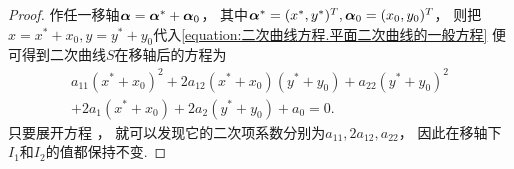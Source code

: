 \begin{theorem}
\begin{proof}
作任一移轴\(\boldsymbol\alpha = \boldsymbol\alpha^* + \boldsymbol\alpha_0\)，
其中\(
	\boldsymbol\alpha^* = (x^*,y^*)^T,
	\boldsymbol\alpha_0 = (x_0,y_0)^T
\)，
则把\(x = x^* + x_0, y = y^* + y_0\)代入\cref{equation:二次曲线方程.平面二次曲线的一般方程}
便可得到二次曲线\(S\)在移轴后的方程为\begin{equation}\label{equation:二次曲线方程的不变量.移轴后的方程}
	\begin{array}{r}
		a_{11} (x^* + x_0)^2
		+ 2 a_{12} (x^* + x_0) (y^* + y_0)
		+ a_{22} (y^* + y_0)^2 \\
		+ 2 a_1 (x^* + x_0)
		+ 2 a_2 (y^* + y_0)
		+ a_0
		= 0.
	\end{array}
\end{equation}
只要展开方程 ，
就可以发现它的二次项系数分别为\(a_{11},2 a_{12},a_{22}\)，
因此在移轴下\(I_1\)和\(I_2\)的值都保持不变.


\end{proof}
\end{theorem}
